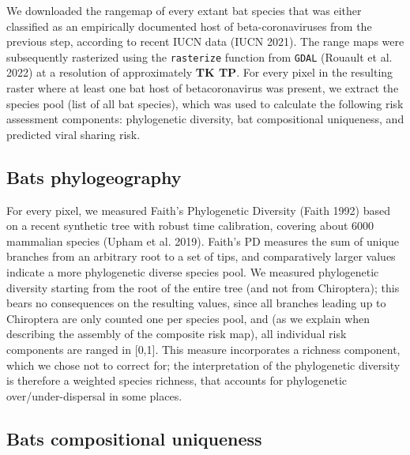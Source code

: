 \documentclass[11pt]{article}
\begin{document}
We downloaded the rangemap of every extant bat species that was either
classified as an empirically documented host of beta-coronaviruses from
the previous step, according to recent IUCN data (IUCN 2021). The range
maps were subsequently rasterized using the \texttt{rasterize} function
from \texttt{GDAL} (Rouault et al. 2022) at a resolution of
approximately \textbf{TK TP}. For every pixel in the resulting raster
where at least one bat host of betacoronavirus was present, we extract
the species pool (list of all bat species), which was used to calculate
the following risk assessment components: phylogenetic diversity, bat
compositional uniqueness, and predicted viral sharing risk.

\hypertarget{bats-phylogeography}{%
\subsection{Bats phylogeography}\label{bats-phylogeography}}

For every pixel, we measured Faith's Phylogenetic Diversity (Faith 1992)
based on a recent synthetic tree with robust time calibration, covering
about 6000 mammalian species (Upham et al. 2019). Faith's PD measures
the sum of unique branches from an arbitrary root to a set of tips, and
comparatively larger values indicate a more phylogenetic diverse species
pool. We measured phylogenetic diversity starting from the root of the
entire tree (and not from Chiroptera); this bears no consequences on the
resulting values, since all branches leading up to Chiroptera are only
counted one per species pool, and (as we explain when describing the
assembly of the composite risk map), all individual risk components are
ranged in {[}0,1{]}. This measure incorporates a richness component,
which we chose not to correct for; the interpretation of the
phylogenetic diversity is therefore a weighted species richness, that
accounts for phylogenetic over/under-dispersal in some places.

\hypertarget{bats-compositional-uniqueness}{%
\subsection{Bats compositional
uniqueness}\label{bats-compositional-uniqueness}}
\end{document}
